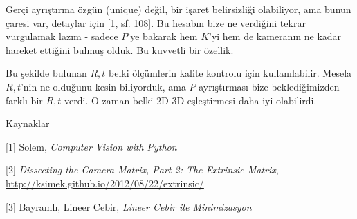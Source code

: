 \documentclass[12pt,fleqn]{article}\usepackage{../../common}
\begin{document}
Gerçi ayrıştırma özgün (unique) değil, bir işaret belirsizliği olabiliyor,
ama bunun çaresi var, detaylar için [1, sf. 108]. Bu hesabın bize ne
verdiğini tekrar vurgulamak lazım - sadece $P$'ye bakarak hem $K$'yi hem de
kameranın ne kadar hareket ettiğini bulmuş olduk. Bu kuvvetli bir özellik.

Bu şekilde bulunan $R,t$ belki ölçümlerin kalite kontrolu için
kullanılabilir. Mesela $R,t$'nin ne olduğunu kesin biliyorduk, ama $P$
ayrıştırması bize beklediğimizden farklı bir $R,t$ verdi. O zaman belki
2D-3D eşleştirmesi daha iyi olabilirdi.


Kaynaklar

[1] Solem, {\em Computer Vision with Python}

[2] {\em Dissecting the Camera Matrix, Part 2: The Extrinsic Matrix}, \url{http://ksimek.github.io/2012/08/22/extrinsic/}

[3] Bayramlı, Lineer Cebir, {\em Lineer Cebir ile Minimizasyon}
\end{document}

